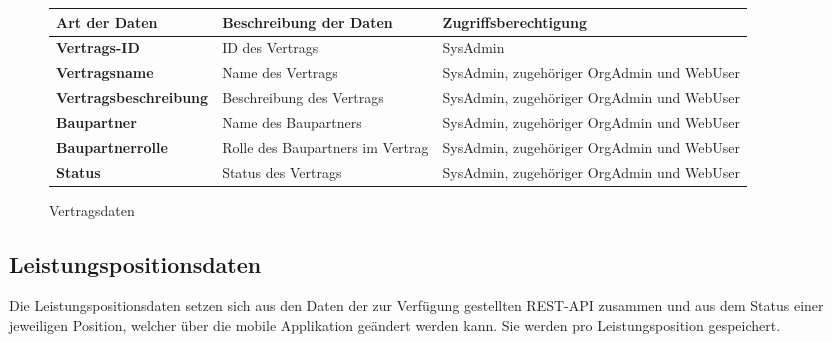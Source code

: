 \begin{figure}[h]
	\centering
	\begin{tabularx}{\textwidth}{| X || X | X |}
        \hline
		\textbf{Art der Daten} & \textbf{Beschreibung der Daten} & \textbf{Zugriffsberechtigung} \\ \hline \hline
		\textbf{Vertrags-ID} & ID des Vertrags & SysAdmin \\ \hline
		\textbf{Vertragsname} & Name des Vertrags & SysAdmin, zugehöriger OrgAdmin und WebUser \\ \hline
        \textbf{Vertragsbeschreibung} & Beschreibung des Vertrags & SysAdmin, zugehöriger OrgAdmin und WebUser \\ \hline
        \textbf{Baupartner} & Name des Baupartners & SysAdmin, zugehöriger OrgAdmin und WebUser \\ \hline
        \textbf{Baupartnerrolle} & Rolle des Baupartners im Vertrag & SysAdmin, zugehöriger OrgAdmin und WebUser \\ \hline
        \textbf{Status} & Status des Vertrags & SysAdmin, zugehöriger OrgAdmin und WebUser \\ \hline
	\end{tabularx}
	\caption{Vertragsdaten}
	\label{fig:Vertragsdaten}
\end{figure}

\newpage

\subsection{Leistungspositionsdaten}

Die Leistungspositionsdaten setzen sich aus den Daten der zur Verf\"ugung gestellten REST-API zusammen und aus dem Status einer jeweiligen Position, welcher über die mobile Applikation geändert werden kann.
Sie werden pro Leistungsposition gespeichert.

